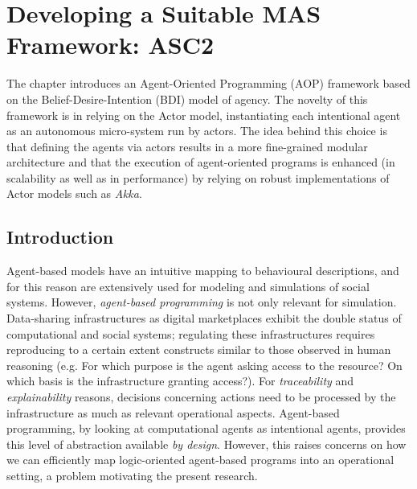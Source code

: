 









\chapter{Developing a Suitable MAS Framework: ASC2}
The chapter introduces an Agent-Oriented Programming (AOP) framework based on the Belief-Desire-Intention (BDI) model of agency. The novelty of this framework is in relying on the Actor model, instantiating each intentional agent as an autonomous micro-system run by actors. The idea behind this choice is that defining the agents via actors results in a more fine-grained modular architecture and that the execution of agent-oriented programs is enhanced (in scalability as well as in performance) by relying on robust implementations of Actor models such as \textit{Akka}.


\section{Introduction}
Agent-based models have an intuitive mapping to behavioural descriptions, and for this reason are extensively used for modeling and simulations of social systems. However, \textit{agent-based programming} is not only relevant for simulation. Data-sharing infrastructures as digital marketplaces exhibit the double status of computational and social systems; regulating these infrastructures requires reproducing to a certain extent constructs similar to those observed in human reasoning (e.g. For which purpose is the agent asking access to the resource? On which basis is the infrastructure granting access?). For \textit{traceability} and \textit{explainability} reasons, decisions concerning actions need to be processed by the infrastructure as much as relevant operational aspects. Agent-based programming, by looking at computational agents as intentional agents, provides this level of abstraction available \textit{by design}. However, this raises concerns on how we can efficiently map logic-oriented agent-based programs into an operational setting, a problem motivating the present research.


